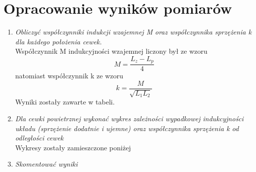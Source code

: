 \documentclass[a4paper,10pt,twoside]{article}
\begin{document}
 \newpage
	
	\section{Opracowanie wyników pomiarów}
	\begin{enumerate}
		\item \textit{Obliczyć
			współczynniki  indukcji  wzajemnej 
			M
			oraz  współczynnika  sprzężenia 
			k
			dla  każdego  położenia 
			cewek. }\vspace{10pt}
		\\ Współczynnik M indukcyjności wzajemnej liczony był ze wzoru 
		$$ M = \frac{L_z - L_p}{4}$$ natomiast współczynnik k ze wzoru 
		$$k = \frac{M}{\sqrt{L_1 L_2}} $$ Wyniki zostały zawarte w tabeli.
		\item \textit{ Dla  cewki  powietrznej  wykonać
		wykres  zależności  wypadkowej  indukcyjności  układu  (sprzężenie  dodatnie
		i ujemne) oraz współczynnika sprzężenia 
		k
		od odległości cewek}\vspace{10pt} \\Wykresy zostały zamieszczone poniżej
		\item \textit{Skomentować wyniki}
	\end{enumerate}
	\begin{figure}[H]
	\end{figure}
\end{document}
